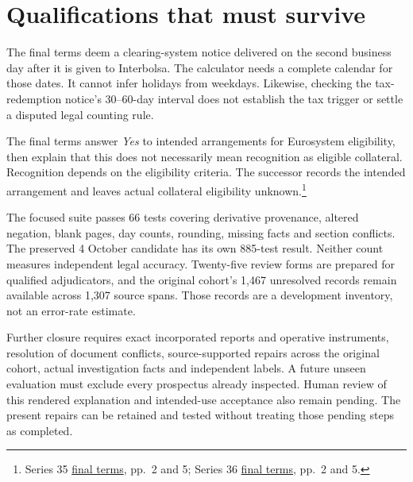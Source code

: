 \documentclass[11pt,a4paper]{article}
\begin{document}
\section*{Qualifications that must survive}

The final terms deem a clearing-system notice delivered on the second business
day after it is given to Interbolsa. The calculator needs a complete calendar
for those dates. It cannot infer holidays from weekdays. Likewise, checking
the tax-redemption notice's 30--60-day interval does not establish the tax
trigger or settle a disputed legal counting rule.

The final terms answer \emph{Yes} to intended arrangements for Eurosystem
eligibility, then explain that this does not necessarily mean recognition as
eligible collateral. Recognition depends on the eligibility criteria.
The successor records the intended arrangement and leaves actual collateral
eligibility unknown.\footnote{Series 35 \href{../../prospectus/corner-cases-2026-10-04/sources/jur-more-bes-1922255/source.pdf}{final terms}, pp.~2 and 5; Series 36 \href{../../prospectus/jurisdiction-2026-10-04/sources/jur-bes-2014-ptbeqkom0019/source.pdf}{final terms}, pp.~2 and 5.}

The focused suite passes 66 tests covering derivative provenance, altered
negation, blank pages, day counts, rounding, missing facts and section conflicts.
The preserved 4 October candidate has its own 885-test result. Neither count
measures independent legal accuracy. Twenty-five review forms are prepared
for qualified adjudicators, and the original cohort's 1,467 unresolved records
remain available across 1,307 source spans. Those records are a development
inventory, not an error-rate estimate.

Further closure requires exact incorporated reports and operative instruments,
resolution of document conflicts, source-supported repairs across the original
cohort, actual investigation facts and independent labels. A future unseen
evaluation must exclude every prospectus already inspected. Human review of
this rendered explanation and intended-use acceptance also remain pending.
The present repairs can be retained and tested without treating those pending
steps as completed.
\end{document}
